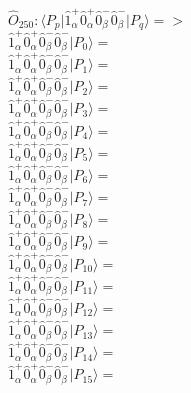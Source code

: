 \documentclass[14pt]{article}
\begin{document}
    $\hat{O}_{250}:  \langle{P_p}\vert \hat{1}_{\alpha}^{+}\hat{0}_{\alpha}^{+}\hat{0}_{\beta}^{-}\hat{0}_{\beta}^{-} \vert{P_q}\rangle => $ \\ 
    $ \hat{1}_{\alpha}^{+}\hat{0}_{\alpha}^{+}\hat{0}_{\beta}^{-}\hat{0}_{\beta}^{-} \vert{P_{0}}\rangle =  $ \\ 
    $ \hat{1}_{\alpha}^{+}\hat{0}_{\alpha}^{+}\hat{0}_{\beta}^{-}\hat{0}_{\beta}^{-} \vert{P_{1}}\rangle =  $ \\ 
    $ \hat{1}_{\alpha}^{+}\hat{0}_{\alpha}^{+}\hat{0}_{\beta}^{-}\hat{0}_{\beta}^{-} \vert{P_{2}}\rangle =  $ \\ 
    $ \hat{1}_{\alpha}^{+}\hat{0}_{\alpha}^{+}\hat{0}_{\beta}^{-}\hat{0}_{\beta}^{-} \vert{P_{3}}\rangle =  $ \\ 
    $ \hat{1}_{\alpha}^{+}\hat{0}_{\alpha}^{+}\hat{0}_{\beta}^{-}\hat{0}_{\beta}^{-} \vert{P_{4}}\rangle =  $ \\ 
    $ \hat{1}_{\alpha}^{+}\hat{0}_{\alpha}^{+}\hat{0}_{\beta}^{-}\hat{0}_{\beta}^{-} \vert{P_{5}}\rangle =  $ \\ 
    $ \hat{1}_{\alpha}^{+}\hat{0}_{\alpha}^{+}\hat{0}_{\beta}^{-}\hat{0}_{\beta}^{-} \vert{P_{6}}\rangle =  $ \\ 
    $ \hat{1}_{\alpha}^{+}\hat{0}_{\alpha}^{+}\hat{0}_{\beta}^{-}\hat{0}_{\beta}^{-} \vert{P_{7}}\rangle =  $ \\ 
    $ \hat{1}_{\alpha}^{+}\hat{0}_{\alpha}^{+}\hat{0}_{\beta}^{-}\hat{0}_{\beta}^{-} \vert{P_{8}}\rangle =  $ \\ 
    $ \hat{1}_{\alpha}^{+}\hat{0}_{\alpha}^{+}\hat{0}_{\beta}^{-}\hat{0}_{\beta}^{-} \vert{P_{9}}\rangle =  $ \\ 
    $ \hat{1}_{\alpha}^{+}\hat{0}_{\alpha}^{+}\hat{0}_{\beta}^{-}\hat{0}_{\beta}^{-} \vert{P_{10}}\rangle =  $ \\ 
    $ \hat{1}_{\alpha}^{+}\hat{0}_{\alpha}^{+}\hat{0}_{\beta}^{-}\hat{0}_{\beta}^{-} \vert{P_{11}}\rangle =  $ \\ 
    $ \hat{1}_{\alpha}^{+}\hat{0}_{\alpha}^{+}\hat{0}_{\beta}^{-}\hat{0}_{\beta}^{-} \vert{P_{12}}\rangle =  $ \\ 
    $ \hat{1}_{\alpha}^{+}\hat{0}_{\alpha}^{+}\hat{0}_{\beta}^{-}\hat{0}_{\beta}^{-} \vert{P_{13}}\rangle =  $ \\ 
    $ \hat{1}_{\alpha}^{+}\hat{0}_{\alpha}^{+}\hat{0}_{\beta}^{-}\hat{0}_{\beta}^{-} \vert{P_{14}}\rangle =  $ \\ 
    $ \hat{1}_{\alpha}^{+}\hat{0}_{\alpha}^{+}\hat{0}_{\beta}^{-}\hat{0}_{\beta}^{-} \vert{P_{15}}\rangle =  $ \\ 
    
\end{document}
